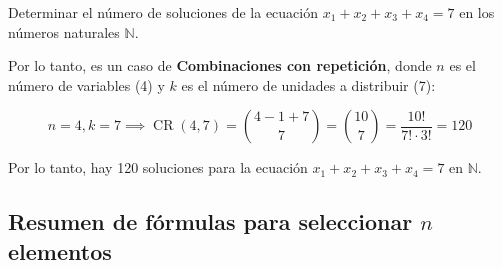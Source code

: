 \documentclass[a4paper,12pt]{article}
\begin{document}
\begin{ejemplo}[title=Ejemplo 2: Soluciones de una ecuación]
Determinar el número de soluciones de la ecuación $x_1 + x_2 + x_3 + x_4 = 7$ en los números naturales $\mathbb{N}$.

\vspace{0.5em}

Por lo tanto, es un caso de \textbf{Combinaciones con repetición}, donde $n$ es el número de variables (4) y $k$ es el número de unidades a distribuir (7):

\[
n = 4, k = 7 \implies \operatorname{CR}(4,7) = \binom{4-1+7}{7} = \binom{10}{7} = \frac{10!}{7! \cdot 3!} = 120
\]

Por lo tanto, hay 120 soluciones para la ecuación $x_1 + x_2 + x_3 + x_4 = 7$ en $\mathbb{N}$.
\end{ejemplo}

\subsection{Resumen de fórmulas para seleccionar $n$ elementos}
\end{document}
